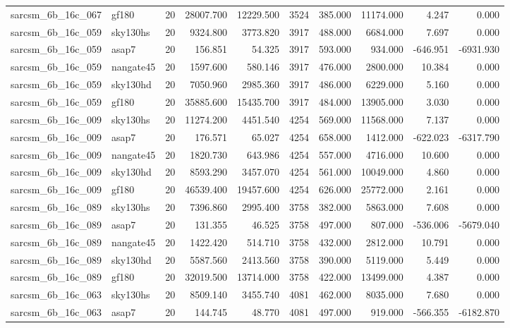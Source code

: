 \begin{tabular}{llrrrrrrrr}
sarcsm\_6b\_16c\_067 & gf180 & 20 & 28007.700 & 12229.500 & 3524 & 385.000 & 11174.000 & 4.247 & 0.000 \\
sarcsm\_6b\_16c\_059 & sky130hs & 20 & 9324.800 & 3773.820 & 3917 & 488.000 & 6684.000 & 7.697 & 0.000 \\
sarcsm\_6b\_16c\_059 & asap7 & 20 & 156.851 & 54.325 & 3917 & 593.000 & 934.000 & -646.951 & -6931.930 \\
sarcsm\_6b\_16c\_059 & nangate45 & 20 & 1597.600 & 580.146 & 3917 & 476.000 & 2800.000 & 10.384 & 0.000 \\
sarcsm\_6b\_16c\_059 & sky130hd & 20 & 7050.960 & 2985.360 & 3917 & 486.000 & 6229.000 & 5.160 & 0.000 \\
sarcsm\_6b\_16c\_059 & gf180 & 20 & 35885.600 & 15435.700 & 3917 & 484.000 & 13905.000 & 3.030 & 0.000 \\
sarcsm\_6b\_16c\_009 & sky130hs & 20 & 11274.200 & 4451.540 & 4254 & 569.000 & 11568.000 & 7.137 & 0.000 \\
sarcsm\_6b\_16c\_009 & asap7 & 20 & 176.571 & 65.027 & 4254 & 658.000 & 1412.000 & -622.023 & -6317.790 \\
sarcsm\_6b\_16c\_009 & nangate45 & 20 & 1820.730 & 643.986 & 4254 & 557.000 & 4716.000 & 10.600 & 0.000 \\
sarcsm\_6b\_16c\_009 & sky130hd & 20 & 8593.290 & 3457.070 & 4254 & 561.000 & 10049.000 & 4.860 & 0.000 \\
sarcsm\_6b\_16c\_009 & gf180 & 20 & 46539.400 & 19457.600 & 4254 & 626.000 & 25772.000 & 2.161 & 0.000 \\
sarcsm\_6b\_16c\_089 & sky130hs & 20 & 7396.860 & 2995.400 & 3758 & 382.000 & 5863.000 & 7.608 & 0.000 \\
sarcsm\_6b\_16c\_089 & asap7 & 20 & 131.355 & 46.525 & 3758 & 497.000 & 807.000 & -536.006 & -5679.040 \\
sarcsm\_6b\_16c\_089 & nangate45 & 20 & 1422.420 & 514.710 & 3758 & 432.000 & 2812.000 & 10.791 & 0.000 \\
sarcsm\_6b\_16c\_089 & sky130hd & 20 & 5587.560 & 2413.560 & 3758 & 390.000 & 5119.000 & 5.449 & 0.000 \\
sarcsm\_6b\_16c\_089 & gf180 & 20 & 32019.500 & 13714.000 & 3758 & 422.000 & 13499.000 & 4.387 & 0.000 \\
sarcsm\_6b\_16c\_063 & sky130hs & 20 & 8509.140 & 3455.740 & 4081 & 462.000 & 8035.000 & 7.680 & 0.000 \\
sarcsm\_6b\_16c\_063 & asap7 & 20 & 144.745 & 48.770 & 4081 & 497.000 & 919.000 & -566.355 & -6182.870 \\

\end{tabular}
